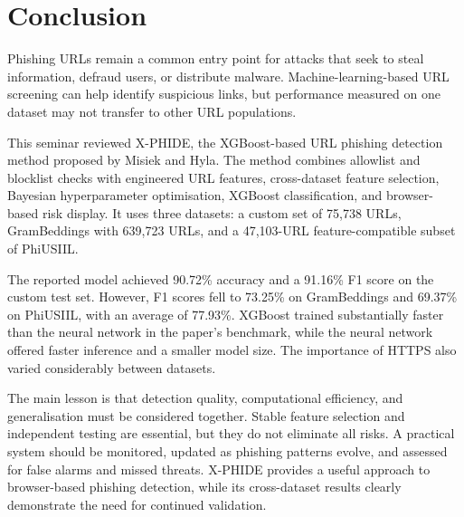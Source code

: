 \chapter{Conclusion}
\setcounter{equation}{0}
Phishing URLs remain a common entry point for attacks that seek to steal information, defraud users, or distribute malware. Machine-learning-based URL screening can help identify suspicious links, but performance measured on one dataset may not transfer to other URL populations.

This seminar reviewed X-PHIDE, the XGBoost-based URL phishing detection method proposed by Misiek and Hyla. The method combines allowlist and blocklist checks with engineered URL features, cross-dataset feature selection, Bayesian hyperparameter optimisation, XGBoost classification, and browser-based risk display. It uses three datasets: a custom set of 75,738 URLs, GramBeddings with 639,723 URLs, and a 47,103-URL feature-compatible subset of PhiUSIIL.\cite{bib1}

The reported model achieved 90.72\% accuracy and a 91.16\% F1 score on the custom test set. However, F1 scores fell to 73.25\% on GramBeddings and 69.37\% on PhiUSIIL, with an average of 77.93\%. XGBoost trained substantially faster than the neural network in the paper's benchmark, while the neural network offered faster inference and a smaller model size. The importance of HTTPS also varied considerably between datasets.

The main lesson is that detection quality, computational efficiency, and generalisation must be considered together. Stable feature selection and independent testing are essential, but they do not eliminate all risks. A practical system should be monitored, updated as phishing patterns evolve, and assessed for false alarms and missed threats. X-PHIDE provides a useful approach to browser-based phishing detection, while its cross-dataset results clearly demonstrate the need for continued validation.\cite{bib1}
